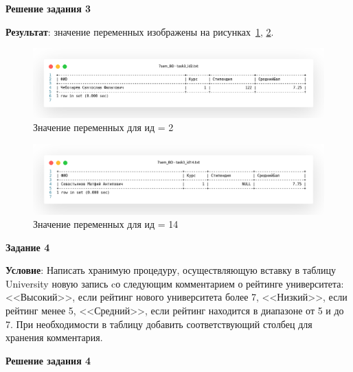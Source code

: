 \begin{center}
  \textbf{Решение задания 3}
\end{center}



\textbf{Результат}: значение переменных изображены на рисунках~\ref{fig:task3_1}, \ref{fig:task3_2}.

\begin{figure}[!h]
  \centering

  \includegraphics[width=18cm]
  {../sql/task3/task3_id2.png}

  \caption{Значение переменных для ид = 2}

  \label{fig:task3_1}
\end{figure}

\begin{figure}[!h]
  \centering

  \includegraphics[width=18cm]
  {../sql/task3/task3_id14.png}

  \caption{Значение переменных для ид = 14}

  \label{fig:task3_2}
\end{figure}

\begin{center}
  \textbf{Задание 4}
\end{center}

\textbf{Условие}:
Написать хранимую процедуру, осуществляющую вставку в таблицу University новую запись cо следующим комментарием о рейтинге университета:
<<Высокий>>, если рейтинг нового университета более 7,
<<Низкий>>, если рейтинг менее 5,
<<Средний>>, если рейтинг находится в диапазоне от 5 и до 7.
При необходимости в таблицу добавить соответствующий столбец для хранения комментария.

\begin{center}
  \textbf{Решение задания 4}
\end{center}

